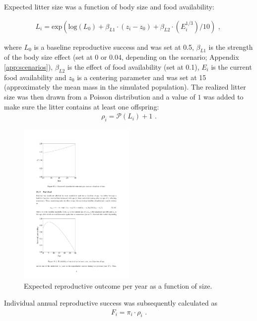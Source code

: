 Expected litter size was a function of body size and food availability:

\begin{align}
L_i = \mathrm{exp}(\mathrm{log}(L_{0}) + \beta_{L1} \cdot (z_i-z_0) + \beta_{L2} \cdot (E_i^{1/3}) / 10) \text{ , }
\end{align}

where $L_{0}$ is a baseline reproductive success and was set at 0.5, $\beta_{L1}$ is the strength of the body size effect (set at 0 or 0.04, depending on the scenario; Appendix \ref{app:scenarios}), $\beta_{L2}$ is the effect of food availability (set at 0.1), $E_i$ is the current food availability and $z_0$ is a centering parameter and was set at 15 (approximately the mean mass in the simulated population).
The realized litter size was then drawn from a Poisson distribution and a value of $1$ was added to make sure the litter contains at least one offspring:
\begin{align}
\rho_i = \mathcal{P}(L_i) + 1 \text{ .}
\end{align}
\begin{figure}[ht]
\centering
	\includegraphics[width=0.5\textwidth]{Appendices/FigS1}
  \caption{\footnotesize Expected reproductive outcome per year as a function of size.}
   \label{SizeRho}
\end{figure}

Individual annual reproductive success was subsequently calculated as
\begin{align}
F_i = \pi_i \cdot \rho_i \text{ .}
\end{align}

